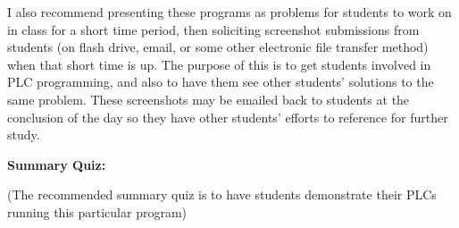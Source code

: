 \vskip 10pt

I also recommend presenting these programs as problems for students to work on in class for a short time period, then soliciting screenshot submissions from students (on flash drive, email, or some other electronic file transfer method) when that short time is up.  The purpose of this is to get students involved in PLC programming, and also to have them see other students' solutions to the same problem.  These screenshots may be emailed back to students at the conclusion of the day so they have other students' efforts to reference for further study.

\vfil \eject

\noindent
{\bf Summary Quiz:}

(The recommended summary quiz is to have students demonstrate their PLCs running this particular program)




